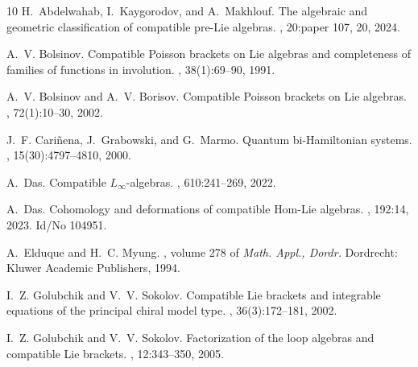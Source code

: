 \documentclass{jonasart}
\begin{document}
	{\footnotesize
    \begin{thebibliography}{10}
        H.~Abdelwahab, I.~Kaygorodov, and A.~Makhlouf.
        \newblock The algebraic and geometric classification of compatible pre-{Lie}
        algebras.
        , 20:paper
        107, 20, 2024.
        
        A.~V. Bolsinov.
        \newblock Compatible {Poisson} brackets on {Lie} algebras and completeness of
        families of functions in involution.
        , 38(1):69--90, 1991.
        
        A.~V. Bolsinov and A.~V. Borisov.
        \newblock Compatible {Poisson} brackets on {Lie} algebras.
        , 72(1):10--30, 2002.
        
        J.~F. Cari{\~n}ena, J.~Grabowski, and G.~Marmo.
        \newblock Quantum bi-{Hamiltonian} systems.
        , 15(30):4797--4810, 2000.
        
        A.~Das.
        \newblock Compatible {$L_\infty$}-algebras.
        , 610:241--269, 2022.
        
        A.~Das.
        \newblock Cohomology and deformations of compatible {Hom}-{Lie} algebras.
        , 192:14, 2023.
        \newblock Id/No 104951.
        
        A.~Elduque and H.~C. Myung.
        , volume 278 of {\em Math.
        Appl., Dordr.}
        \newblock Dordrecht: Kluwer Academic Publishers, 1994.
        
        I.~Z. Golubchik and V.~V. Sokolov.
        \newblock Compatible {Lie} brackets and integrable equations of the principal
        chiral model type.
        , 36(3):172--181, 2002.
        
        I.~Z. Golubchik and V.~V. Sokolov.
        \newblock Factorization of the loop algebras and compatible {Lie} brackets.
        , 12:343--350, 2005.
        

\end{thebibliography}}
\end{document}
